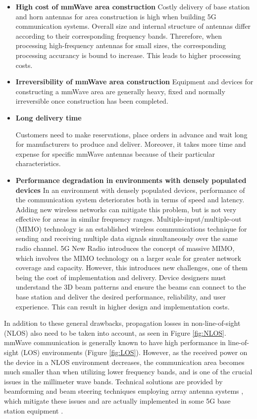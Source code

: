 \documentclass[a4paper,12pt]{report}
\begin{document}
\begin{itemize}
  \item[] \textbf{High cost of mmWave area construction}
  Costly delivery of base station and horn antennas for area construction
  is high when building 5G communication systems.
  Overall size and internal structure of antennas differ according
  to their corresponding frequency bands.
  Threrefore, when processing high-frequency antennas for small sizes,
  the corresponding processing accurancy is bound to increase.
  This leads to higher processing costs.

  \item[] \textbf{Irreversibility of mmWave area construction}
  Equipment and devices for constructing a mmWave area are generally heavy,
  fixed and normally irreversible once construction has been completed.

  \item[] \textbf{Long delivery time}

  Customers need to make reservations, place orders
  in advance and wait long for manufacturers to produce and deliver.
  Moreover, it takes more time and expense for specific mmWave antennas
  because of their particular characteristics.

  \item[] \textbf{Performance degradation in environments with densely populated devices}
  In an environment with densely populated devices,
  performance of the communication system deteriorates
  both in terms of speed and latency.
  Adding new wireless networks can mitigate this problem,
  but is not very effective for areas in similar frequency ranges.
  Multiple-input/multiple-out (MIMO) technology is
  an established wireless communications technique
  for sending and receiving multiple data signals
  simultaneously over the same radio channel.
  5G New Radio introduces the concept of massive MIMO,
  which involves the MIMO technology on a larger scale for
  greater network coverage and capacity.
  However, this introduces new challenges,
  one of them being the cost of implementation and delivery.
  Device designers must understand the 3D beam patterns and
  ensure the beams can connect to the base station
  and deliver the desired performance,
  reliability, and user experience.
  This can result in higher design and implementation costs.
\end{itemize}

In addition to these general drawbacks,
propagation losses in non-line-of-sight (NLOS) also need to be taken into account,
as seen in Figure \ref{fig:NLOS}.
mmWave communication is generally
known to have high performance in line-of-sight (LOS) environments (Figure \ref{fig:LOS}).
However, as the received power on the device in a NLOS environment decreases,
the communication area becomes much smaller than when
utilizing lower frequency bands,
and is one of the crucial issues in the millimeter wave bands.
Technical solutions are provided by beamforming and
beam steering techniques employing array antenna systems \cite{6515173},
which mitigate these issues and are
actually implemented in some 5G base station equipment
\cite{https://doi.org/10.48550/arxiv.2001.05021}.
\end{document}
